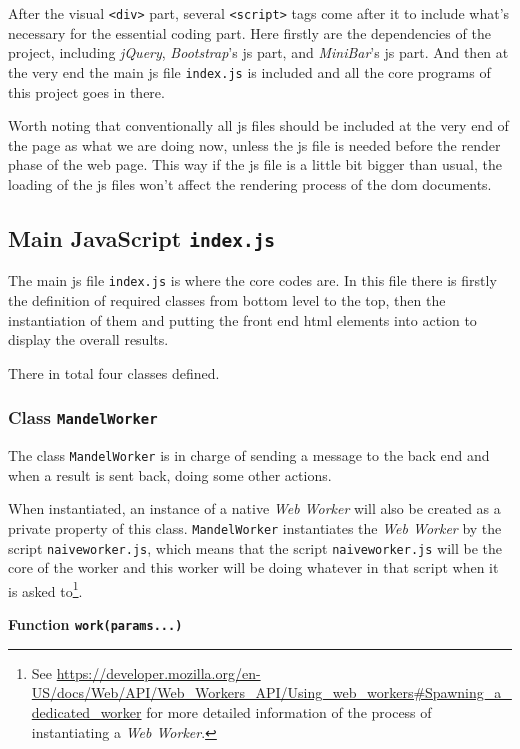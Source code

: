 After the visual \texttt{<div>} part, several \texttt{<script>} tags come after it to include what's necessary for the essential coding part. Here firstly are the dependencies of the project, including \emph{jQuery}, \emph{Bootstrap}'s \gls{js} part, and \emph{MiniBar}'s \gls{js} part. And then at the very end the main \gls{js} file \texttt{index.js} is included and all the core programs of this project goes in there.

Worth noting that conventionally all \gls{js} files should be included at the very end of the page as what we are doing now, unless the \gls{js} file is needed before the render phase of the web page. This way if the \gls{js} file is a little bit bigger than usual, the loading of the \gls{js} files won't affect the rendering process of the \gls{dom} documents.


\subsection{Main JavaScript \texttt{index.js}}

The main \gls{js} file \texttt{index.js} is where the core codes are. In this file there is firstly the definition of required classes from bottom level to the top, then the instantiation of them and putting the front end \gls{html} elements into action to display the overall results.

There in total four classes defined.

\subsubsection{Class \texttt{MandelWorker}}

The class \texttt{MandelWorker} is in charge of sending a message to the back end and when a result is sent back, doing some other actions.

When instantiated, an instance of a native \emph{Web Worker} will also be created as a private property of this class. \texttt{MandelWorker} instantiates the \emph{Web Worker} by the script \texttt{naive\-worker.js}, which means that the script \texttt{naive\-worker.js} will be the core of the worker and this worker will be doing whatever in that script when it is asked to\footnote{ See \url{https://developer.mozilla.org/en-US/docs/Web/API/Web_Workers_API/Using_web_workers\#Spawning_a_dedicated_worker} for more detailed information of the process of instantiating a \emph{Web Worker}.}.

\textbf{Function \texttt{work(params...)}}

